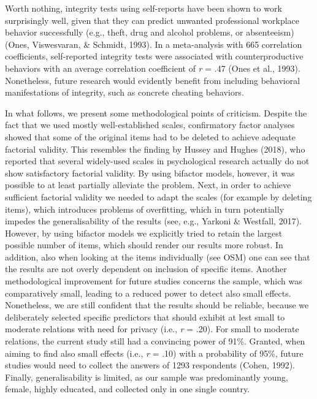 \documentclass[man,floatsintext]{apa6}
\begin{document}
Worth nothing, integrity tests using self-reports have been shown to work surprisingly well, given that they can predict unwanted professional workplace behavior successfully (e.g., theft, drug and alcohol problems, or absenteeism) (Ones, Viswesvaran, \& Schmidt, 1993). In a meta-analysis with 665 correlation coefficients, self-reported integrity tests were associated with counterproductive behaviors with an average correlation coefficient of \emph{r} = .47 (Ones et al., 1993). Nonetheless, future research would evidently benefit from including behavioral manifestations of integrity, such as concrete cheating behaviors.

In what follows, we present some methodological points of criticism. Despite the fact that we used mostly well-established scales, confirmatory factor analyses showed that some of the original items had to be deleted to achieve adequate factorial validity. This resembles the finding by Hussey and Hughes (2018), who reported that several widely-used scales in psychological research actually do not show satisfactory factorial validity. By using bifactor models, however, it was possible to at least partially alleviate the problem. Next, in order to achieve sufficient factorial validity we needed to adapt the scales (for example by deleting items), which introduces problems of overfitting, which in turn potentially impedes the generalisability of the results (see, e.g., Yarkoni \& Westfall, 2017). However, by using bifactor models we explicitly tried to retain the largest possible number of items, which should render our results more robust. In addition, also when looking at the items individually (see OSM) one can see that the results are not overly dependent on inclusion of specific items. Another methodological improvement for future studies concerns the sample, which was comparatively small, leading to a reduced power to detect also small effects. Nonetheless, we are still confident that the results should be reliable, because we deliberately selected specific predictors that should exhibit at lest small to moderate relations with need for privacy (i.e., \emph{r} = .20). For small to moderate relations, the current study still had a convincing power of 91\%. Granted, when aiming to find also small effects (i.e., \emph{r} = .10) with a probability of 95\%, future studies would need to collect the answers of 1293 respondents (Cohen, 1992). Finally, generalisability is limited, as our sample was predominantly young, female, highly educated, and collected only in one single country.
\end{document}
